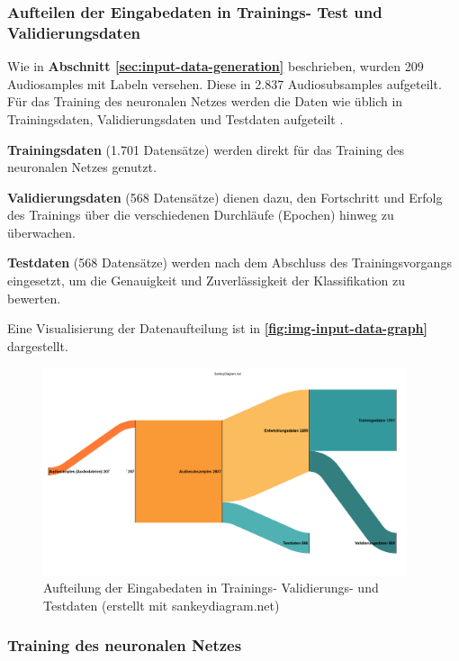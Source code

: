 \subsubsection{Aufteilen der Eingabedaten in Trainings- Test und Validierungsdaten}
Wie in \textbf{Abschnitt \ref{sec:input-data-generation} }beschrieben, wurden 209 Audiosamples mit Labeln versehen. Diese  in 2.837 Audiosubsamples aufgeteilt. Für das Training des neuronalen Netzes werden die Daten wie üblich in Trainingsdaten, Validierungsdaten und Testdaten aufgeteilt \cite{ml-data-splitting-reason}.

\textbf{Trainingsdaten} (1.701 Datensätze) werden direkt für das Training des neuronalen Netzes genutzt.

\textbf{Validierungsdaten} (568 Datensätze) dienen dazu, den Fortschritt und Erfolg des Trainings über die verschiedenen Durchläufe (Epochen) hinweg zu überwachen.

\textbf{Testdaten} (568 Datensätze) werden nach dem Abschluss des Trainingsvorgangs eingesetzt, um die Genauigkeit und Zuverlässigkeit der Klassifikation zu bewerten.

Eine Visualisierung der Datenaufteilung ist in \textbf{\autoref{fig:img-input-data-graph}} dargestellt.

\begin{figure}[h!]
\centering
\includegraphics[width=0.95\textwidth]{images/08_durchfuehrung/nn/input-data-graph.png}
\caption{Aufteilung der Eingabedaten in Trainings- Validierungs- und Testdaten (erstellt mit sankeydiagram.net)}
\label{fig:img-input-data-graph}
\end{figure}

\subsubsection{Training des neuronalen Netzes}


